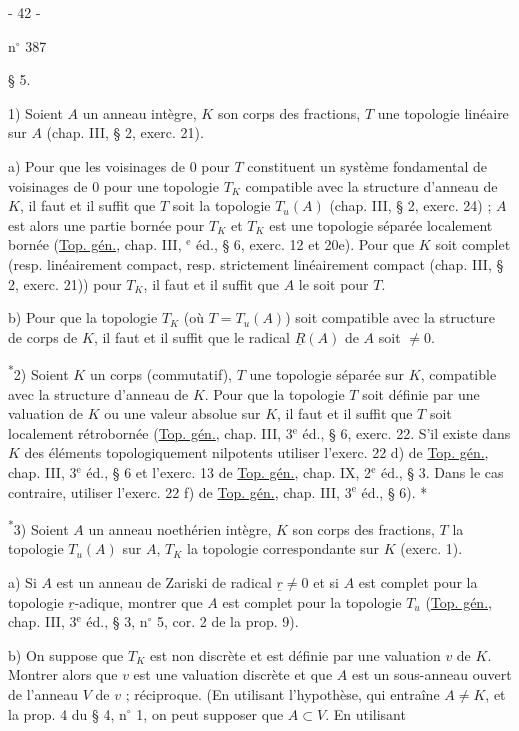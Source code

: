 \begin{center}- 42 -\end{center}
\hfill n$^\circ$ 387
\begin{center}§ 5.\end{center}

1) Soient $A$ un anneau intègre, $K$ son corps des fractions, $T$ une topologie linéaire sur $A$ (chap. III, § 2, exerc. 21).

a) Pour que les voisinages de $0$ pour $T$ constituent un système fondamental de voisinages de $0$ pour une topologie $T_K$ compatible avec la structure d'anneau de $K$, il faut et il suffit que $T$ soit la topologie $T_u(A)$ (chap. III, § 2, exerc. 24) ; $A$ est alors une partie bornée pour $T_K$ et $T_K$ est une topologie séparée localement bornée (\uline{Top. gén.}, chap. III, $^{\mathrm e}$ éd., § 6, exerc. 12 et 20e). Pour que $K$ soit complet (resp. linéairement compact, resp. strictement linéairement compact (chap. III, § 2, exerc. 21)) pour $T_K$, il faut et il suffit que $A$ le soit pour $T$.

b) Pour que la topologie $T_K$ (où $T=T_u(A)$) soit compatible avec la structure de corps de $K$, il faut et il suffit que le radical $\underline R(A)$ de $A$ soit $\ne0$.

\textsuperscript{*}2) Soient $K$ un corps (commutatif), $T$ une topologie séparée sur $K$, compatible avec la structure d'anneau de $K$. Pour que la topologie $T$ soit définie par une valuation de $K$ ou une valeur absolue sur $K$, il faut et il suffit que $T$ soit localement rétrobornée (\uline{Top. gén.}, chap. III, 3$^{\mathrm e}$ éd., § 6, exerc. 22. S'il existe dans $K$ des éléments topologiquement nilpotents utiliser l'exerc. 22 d) de \uline{Top. gén.}, chap. III, 3$^{\mathrm e}$ éd., § 6 et l'exerc. 13 de \uline{Top. gén.}, chap. IX, 2$^{\mathrm e}$ éd., § 3. Dans le cas contraire, utiliser l'exerc. 22 f) de \uline{Top. gén.}, chap. III, 3$^{\mathrm e}$ éd., § 6). *

\textsuperscript{*}3) Soient $A$ un anneau noethérien intègre, $K$ son corps des fractions, $T$ la topologie $T_u(A)$ sur $A$, $T_K$ la topologie correspondante sur $K$ (exerc. 1).

a) Si $A$ est un anneau de Zariski de radical $\underline r\ne0$ et si $A$ est complet pour la topologie $\underline r$-adique, montrer que $A$ est complet pour la topologie $T_u$ (\uline{Top. gén.}, chap. III, 3$^{\mathrm e}$ éd., § 3, n$^\circ$ 5, cor. 2 de la prop. 9).

b) On suppose que $T_K$ est non discrète et est définie par une valuation $v$ de $K$. Montrer alors que $v$ est une valuation discrète et que $A$ est un sous-anneau ouvert de l'anneau $V$ de $v$ ; réciproque. (En utilisant l'hypothèse, qui entraîne $A\ne K$, et la prop. 4 du § 4, n$^\circ$ 1, on peut supposer que $A\subset V$. En utilisant
